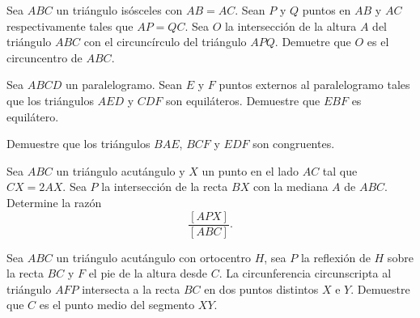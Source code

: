 \begin{problem}
Sea $ABC$ un triángulo isósceles con $AB = AC$. Sean $P$ y $Q$ puntos
en $AB$ y $AC$ respectivamente tales que $AP = QC$. Sea $O$
la intersección de la altura $A$ del triángulo $ABC$ con el
circuncírculo del triángulo $APQ$. Demuetre que $O$ es el
circuncentro de $ABC$.
\end{problem}


\begin{problem}
Sea $ABCD$ un paralelogramo. Sean $E$ y $F$ puntos externos al
paralelogramo tales que los triángulos $AED$ y $CDF$ son equiláteros.
Demuestre que $EBF$ es equilátero.

\begin{hints}
	\begin{hint}
		Demuestre que los triángulos $BAE$, $BCF$ y $EDF$ son congruentes.
	\end{hint}
\end{hints}
\end{problem}


\begin{problem}[CAM 2025]
Sea $ABC$ un triángulo acutángulo y $X$ un punto en
el lado $AC$ tal que $CX = 2AX$. Sea $P$ la intersección
de la recta $BX$ con la mediana $A$ de $ABC$.
Determine la razón
\[\frac{[APX]}{[ABC]}.\]
\end{problem}

\begin{problem}
Sea $ABC$ un triángulo acutángulo con ortocentro $H$, sea $P$ la reflexión
de $H$ sobre la recta $BC$ y $F$ el pie de la altura desde $C$. La
circunferencia circunscripta al triángulo $AFP$ intersecta
a la recta $BC$ en dos puntos distintos $X$ e $Y$.
Demuestre que $C$ es el punto medio del segmento $XY$.
\end{problem}

